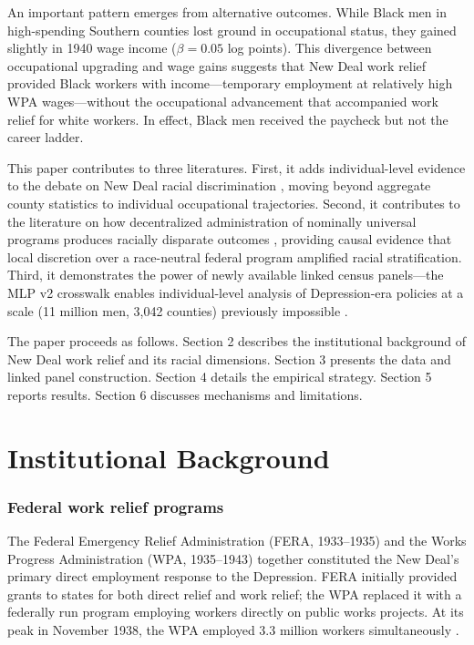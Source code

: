 \documentclass[12pt]{article}
\begin{document}
An important pattern emerges from alternative outcomes. While Black men in high-spending Southern counties lost ground in occupational status, they gained slightly in 1940 wage income ($\beta = 0.05$ log points). This divergence between occupational upgrading and wage gains suggests that New Deal work relief provided Black workers with income---temporary employment at relatively high WPA wages---without the occupational advancement that accompanied work relief for white workers. In effect, Black men received the paycheck but not the career ladder.

This paper contributes to three literatures. First, it adds individual-level evidence to the debate on New Deal racial discrimination \citep{fishback2003, fishback2006, taylor2024, price2010}, moving beyond aggregate county statistics to individual occupational trajectories. Second, it contributes to the literature on how decentralized administration of nominally universal programs produces racially disparate outcomes \citep{alston1984, quadagno1994, katznelson2005}, providing causal evidence that local discretion over a race-neutral federal program amplified racial stratification. Third, it demonstrates the power of newly available linked census panels---the MLP v2 crosswalk enables individual-level analysis of Depression-era policies at a scale (11 million men, 3,042 counties) previously impossible \citep{abramitzky2021, price2020}.

The paper proceeds as follows. Section 2 describes the institutional background of New Deal work relief and its racial dimensions. Section 3 presents the data and linked panel construction. Section 4 details the empirical strategy. Section 5 reports results. Section 6 discusses mechanisms and limitations.

\section{Institutional Background}

\subsubsection*{Federal work relief programs} The Federal Emergency Relief Administration (FERA, 1933--1935) and the Works Progress Administration (WPA, 1935--1943) together constituted the New Deal's primary direct employment response to the Depression. FERA initially provided grants to states for both direct relief and work relief; the WPA replaced it with a federally run program employing workers directly on public works projects. At its peak in November 1938, the WPA employed 3.3 million workers simultaneously \citep{rose1994, fishback2003}.
\end{document}
